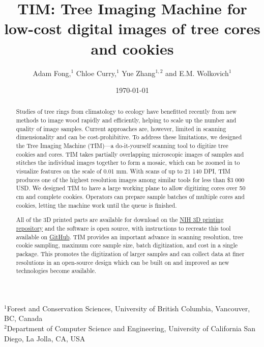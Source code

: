 \documentclass[a4paper,12pt]{article}
\title{TIM: Tree Imaging Machine for low-cost digital images of tree cores and cookies}
\author{Adam Fong,$^{1}$ Chloe Curry,$^{1}$ Yue Zhang$^{1, 2}$ and E.M. Wolkovich$^{1}$} %
\date{\today}
\begin{document}
\maketitle

\noindent $^{1}$Forest and Conservation Sciences, University of British Columbia, Vancouver, BC, Canada\\
$^{2}$Department of Computer Science and Engineering, University of California San Diego, La Jolla, CA, USA\\ 


\begin{abstract}  
Studies of tree rings from climatology to ecology have benefitted recently from new methods to image wood rapidly and efficiently, helping to scale up the number and quality of image samples. Current approaches are, however, limited in scanning dimensionality and can be cost-prohibitive. %
To address these limitations, we designed the Tree Imaging Machine (TIM)---a do-it-yourself scanning tool to digitize tree cookies and cores. TIM takes partially overlapping microscopic images of samples and stitches the individual images together to form 
a mosaic, which can be zoomed in to visualize features on the scale of 0.01 mm. With scans of up to 21 140 DPI, TIM produces one of the highest resolution images among similar tools for less than \$3 000 USD. %
We designed TIM to have a large working plane to allow digitizing cores over 50 cm and complete cookies. Operators can prepare sample batches of multiple cores and cookies, letting the machine work until the queue is finished.

All of the 3D printed parts are available for download on the \href{https://doi.org/10.60705/3DPX/21561.3}{NIH 3D printing repository} and the software is  %
open source, with instructions to recreate this tool available on \href{https://github.com/temporalecologylab/TreeRings}{GitHub}. TIM provides an important advance in scanning resolution, tree cookie sampling, maximum core sample size, batch digitization, and cost in a single package. This promotes the digitization of larger samples and can collect data at finer resolutions in an open-source design which can be built on and improved as new technologies become available. %
\end{abstract}
\end{document}
